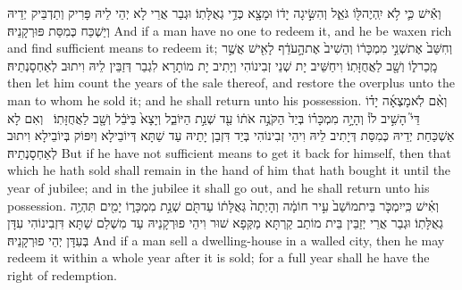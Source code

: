 {וְאִ֕ישׁ כִּ֛י לֹ֥א יִֽהְיֶה\maqqaf לּ֖וֹ גֹּאֵ֑ל וְהִשִּׂ֣יגָה יָד֔וֹ וּמָצָ֖א כְּדֵ֥י גְאֻלָּתֽוֹ׃}
{וּגְבַר אֲרֵי לָא יְהֵי לֵיהּ פָּרִיק וְתַדְבֵּיק יְדֵיהּ וְיַשְׁכַּח כְּמִסַּת פּוּרְקָנֵיהּ׃}
{And if a man have no one to redeem it, and he be waxen rich and find sufficient means to redeem it;}{}
{וְחִשַּׁב֙ אֶת\maqqaf שְׁנֵ֣י מִמְכָּר֔וֹ וְהֵשִׁיב֙ אֶת\maqqaf הָ֣עֹדֵ֔ף לָאִ֖ישׁ אֲשֶׁ֣ר מָֽכַר\maqqaf ל֑וֹ וְשָׁ֖ב לַאֲחֻזָּתֽוֹ׃}
{וִיחַשֵּׁיב יָת שְׁנֵי זְבִינוֹהִי וְיָתִיב יָת מוֹתָרָא לִגְבַר דְּזַבֵּין לֵיהּ וִיתוּב לְאַחְסָנְתֵיהּ׃}
{then let him count the years of the sale thereof, and restore the overplus unto the man to whom he sold it; and he shall return unto his possession.}{}
{וְאִ֨ם לֹֽא\maqqaf מָצְאָ֜ה יָד֗וֹ דֵּי֮ הָשִׁ֣יב לוֹ֒ וְהָיָ֣ה מִמְכָּר֗וֹ בְּיַד֙ הַקֹּנֶ֣ה אֹת֔וֹ עַ֖ד שְׁנַ֣ת הַיּוֹבֵ֑ל וְיָצָא֙ בַּיֹּבֵ֔ל וְשָׁ֖ב לַאֲחֻזָּתֽוֹ׃ \setuma }
{וְאִם לָא אַשְׁכַּחַת יְדֵיהּ כְּמִסַּת דְּיָתִיב לֵיהּ וִיהֵי זְבִינוֹהִי בְּיַד דִּזְבַן יָתֵיהּ עַד שַׁתָּא דְּיוֹבֵילָא וְיִפּוֹק בְּיוֹבֵילָא וִיתוּב לְאַחְסָנְתֵיהּ׃}
{But if he have not sufficient means to get it back for himself, then that which he hath sold shall remain in the hand of him that hath bought it until the year of jubilee; and in the jubilee it shall go out, and he shall return unto his possession.}{}
{וְאִ֗ישׁ כִּֽי\maqqaf יִמְכֹּ֤ר בֵּית\maqqaf מוֹשַׁב֙ עִ֣יר חוֹמָ֔ה וְהָיְתָה֙ גְּאֻלָּת֔וֹ עַד\maqqaf תֹּ֖ם שְׁנַ֣ת מִמְכָּר֑וֹ יָמִ֖ים תִּהְיֶ֥ה גְאֻלָּתֽוֹ׃}
{וּגְבַר אֲרֵי יְזַבֵּין בֵּית מוֹתַב קַרְתָּא מַקְּפָא שׁוּר וִיהֵי פוּרְקָנֵיהּ עַד מִשְׁלַם שַׁתָּא דִּזְבִינוֹהִי עִדָּן בְּעִדָּן יְהֵי פוּרְקָנֵיהּ׃}
{And if a man sell a dwelling-house in a walled city, then he may redeem it within a whole year after it is sold; for a full year shall he have the right of redemption.}{}
